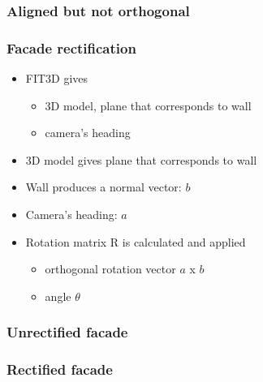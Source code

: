 \documentclass{beamer}
\begin{document}
\frame
{
	\frametitle{Aligned but not orthogonal}
}

\frame
{
	\frametitle{Facade rectification}
	\begin{itemize}
		\item <+-| alert@+> FIT3D gives
			\begin{itemize}
			\item <+-| alert@+> 3D model, plane that corresponds to wall
			\item <+-| alert@+> camera's heading
			\end{itemize}
		\item <+-| alert@+> 3D model gives plane that corresponds to wall
		\item <+-| alert@+> Wall produces a normal vector:  $b$
		\item <+-| alert@+> Camera's heading: $a$
		\item <+-| alert@+> Rotation matrix R is calculated and applied
			\begin{itemize}
			\item <+-| alert@+> orthogonal rotation vector $a$ x $b$
			\item <+-| alert@+> angle $\theta$
			\end{itemize}
	\end{itemize}
}


\frame
{
	\frametitle{Unrectified facade}
}

\frame
{
	\frametitle{Rectified facade}
}


\frame
{
}

\frame
{
}
\end{document}
